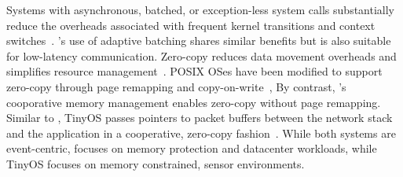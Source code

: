  Systems with
asynchronous, batched, or exception-less system calls substantially
reduce the overheads associated with frequent kernel transitions and
context
switches~\cite{DBLP:conf/osdi/HanMCR12,jeong2014mtcp,DBLP:journals/cacm/Rizzo12,DBLP:conf/osdi/SoaresS10}. \ix's
use of adaptive batching shares similar benefits but is also suitable
for low-latency communication.  Zero-copy reduces data movement
overheads and simplifies resource
management~\cite{DBLP:journals/tocs/PaiDZ00}. POSIX OSes have been
modified to support zero-copy through page remapping and
copy-on-write~\cite{DBLP:conf/usenix/Chu96}, By contrast, \ix's
cooporative memory management enables zero-copy without page
remapping. Similar to \ix, TinyOS passes pointers to packet buffers
between the network stack and the application in a cooperative,
zero-copy fashion~\cite{tinyosnet}.  While both systems are
event-centric, \ix focuses on memory protection and datacenter
workloads, while TinyOS focuses on memory constrained, sensor
environments.


